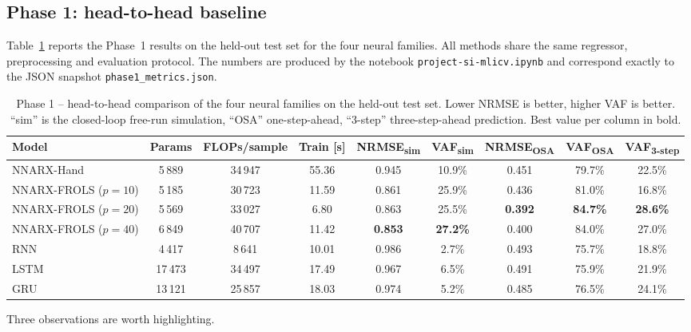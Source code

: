 \documentclass[10pt,twocolumn,letterpaper]{article}
\begin{document}
\subsection{Phase 1: head-to-head baseline}\label{sec:phase1}

Table~\ref{tab:phase1} reports the Phase~1 results on the held-out test
set for the four neural families. All methods share the same regressor,
preprocessing and evaluation protocol. The numbers are produced by the notebook \texttt{project-\allowbreak si-\allowbreak mlicv.ipynb}
and correspond exactly
to the JSON snapshot \texttt{phase1\_metrics.json}.

\begin{table}[t]
\centering
\caption{Phase 1 -- head-to-head comparison of the four neural families
on the held-out test set. Lower NRMSE is better, higher VAF is better.
``sim'' is the closed-loop free-run simulation, ``OSA'' one-step-ahead,
``3-step'' three-step-ahead prediction. Best value per column in bold.}
\label{tab:phase1}
\small
\setlength{\tabcolsep}{4pt}
\begin{tabular}{lcccccccc}
\toprule
\textbf{Model} & \textbf{Params} & \textbf{FLOPs/sample} &
\textbf{Train [s]} &
\textbf{NRMSE\textsubscript{sim}} & \textbf{VAF\textsubscript{sim}} &
\textbf{NRMSE\textsubscript{OSA}} & \textbf{VAF\textsubscript{OSA}} &
\textbf{VAF\textsubscript{3-step}} \\
\midrule
NNARX-Hand           &  5\,889 & 34\,947 & 55.36 & 0.945 & 10.9\% & 0.451 & 79.7\% & 22.5\% \\
NNARX-FROLS ($p=10$) & 5\,185 & 30\,723 & 11.59 & 0.861 & 25.9\% & 0.436 & 81.0\% & 16.8\% \\
NNARX-FROLS ($p=20$) & 5\,569 & 33\,027 &  6.80 & 0.863 & 25.5\% & \textbf{0.392} & \textbf{84.7\%} & \textbf{28.6\%} \\
NNARX-FROLS ($p=40$) & 6\,849 & 40\,707 & 11.42 & \textbf{0.853} & \textbf{27.2\%} & 0.400 & 84.0\% & 27.0\% \\
RNN             &  4\,417 &  8\,641 & 10.01 & 0.986 &  2.7\% & 0.493 & 75.7\% & 18.8\% \\
LSTM            & 17\,473 & 34\,497 & 17.49 & 0.967 &  6.5\% & 0.491 & 75.9\% & 21.9\% \\
GRU             & 13\,121 & 25\,857 & 18.03 & 0.974 &  5.2\% & 0.485 & 76.5\% & 24.1\% \\
\bottomrule
\end{tabular}
\end{table}

Three observations are worth highlighting.
\end{document}
